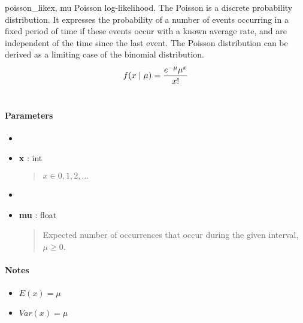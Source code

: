 \hypertarget{pymc.distributions.poisson_like}{}\begin{funcdesc}{poisson\_like}{x, mu}
Poisson log-likelihood. The Poisson is a discrete probability distribution.
It expresses the probability of a number of events occurring in a fixed
period of time if these events occur with a known average rate, and are
independent of the time since the last event. The Poisson distribution can
be derived as a limiting case of the binomial distribution.
\begin{gather}
\begin{split}f(x \mid \mu) = \frac{e^{-\mu}\mu^x}{x!}\end{split}\notag\\\begin{split}\end{split}\notag
\end{gather}
\paragraph{Parameters}
\begin{itemize}
\item[] \item[] \textbf{x} : int
\begin{quote}

$x \in {0,1,2,...}$
\end{quote}

\item[] \item[] \textbf{mu} : float
\begin{quote}

Expected number of occurrences that occur during the given interval,
$\mu \geq 0$.
\end{quote}
\end{itemize}
\paragraph{Notes}
\begin{itemize}
\item {} 
$E(x)=\mu$

\item {} 
$Var(x)=\mu$

\end{itemize}
\end{funcdesc}

